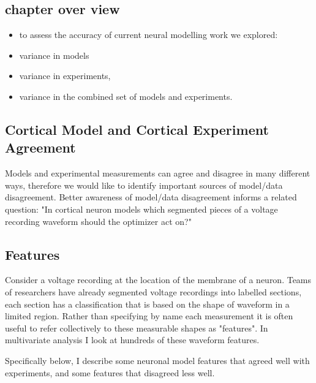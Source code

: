 
\subsection{chapter over view}
\begin{itemize}
\item to assess the accuracy of current neural modelling work we explored:
\item variance in models
\item variance in experiments,  
\item variance in the combined set of models and experiments.
\end{itemize}


\subsection{Cortical Model and Cortical Experiment Agreement}
Models and experimental measurements can agree and disagree in many different ways, therefore we would like to identify important sources of model/data disagreement. Better awareness of model/data disagreement informs a related question: "In  cortical neuron models which segmented pieces of a voltage recording waveform should the optimizer act on?"

\subsection{Features} Consider a voltage recording at the location of the membrane of a neuron. Teams of researchers have already segmented voltage recordings into labelled sections, each section has a classification that is based on the shape of waveform in a limited region. Rather than specifying by name each measurement it is often useful to refer collectively to these measurable shapes as "features". In multivariate analysis I look at hundreds of these waveform features. 

Specifically below, I describe some neuronal model features that agreed well with experiments, and some features that disagreed less well.

